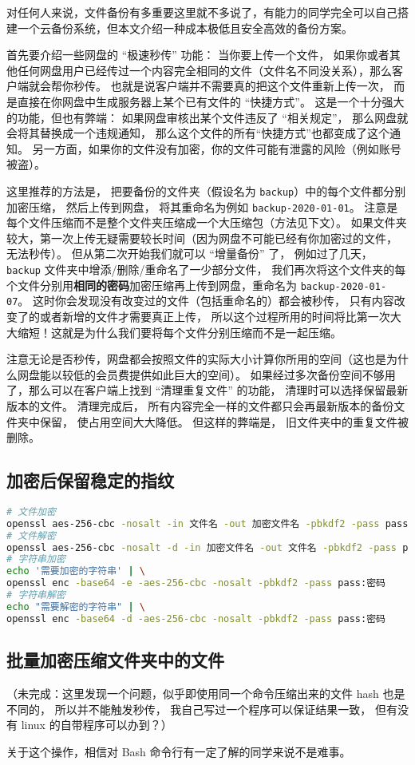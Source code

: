 
\begin{issues}
\issueDraft
\end{issues}

对任何人来说，文件备份有多重要这里就不多说了，有能力的同学完全可以自己搭建一个云备份系统，但本文介绍一种成本极低且安全高效的备份方案。

首先要介绍一些网盘的 “极速秒传” 功能： 当你要上传一个文件， 如果你或者其他任何网盘用户已经传过一个内容完全相同的文件（文件名不同没关系），那么客户端就会帮你秒传。 也就是说客户端并不需要真的把这个文件重新上传一次， 而是直接在你网盘中生成服务器上某个已有文件的 “快捷方式”。 这是一个十分强大的功能，但也有弊端： 如果网盘审核出某个文件违反了 “相关规定”， 那么网盘就会将其替换成一个违规通知， 那么这个文件的所有“快捷方式”也都变成了这个通知。 另一方面，如果你的文件没有加密，你的文件可能有泄露的风险（例如账号被盗）。

这里推荐的方法是， 把要备份的文件夹（假设名为 \verb|backup|）中的每个文件都分别加密压缩， 然后上传到网盘， 将其重命名为例如 \verb|backup-2020-01-01|。 注意是每个文件压缩而不是整个文件夹压缩成一个大压缩包（方法见下文）。 如果文件夹较大，第一次上传无疑需要较长时间（因为网盘不可能已经有你加密过的文件， 无法秒传）。 但从第二次开始我们就可以 “增量备份” 了， 例如过了几天， \verb|backup| 文件夹中增添/删除/重命名了一少部分文件， 我们再次将这个文件夹的每个文件分别用\textbf{相同的密码}加密压缩再上传到网盘，重命名为 \verb|backup-2020-01-07|。 这时你会发现没有改变过的文件（包括重命名的）都会被秒传， 只有内容改变了的或者新增的文件才需要真正上传， 所以这个过程所用的时间将比第一次大大缩短！这就是为什么我们要将每个文件分别压缩而不是一起压缩。

注意无论是否秒传，网盘都会按照文件的实际大小计算你所用的空间（这也是为什么网盘能以较低的会员费提供如此巨大的空间）。 如果经过多次备份空间不够用了，那么可以在客户端上找到 “清理重复文件” 的功能， 清理时可以选择保留最新版本的文件。 清理完成后， 所有内容完全一样的文件都只会再最新版本的备份文件夹中保留， 使占用空间大大降低。 但这样的弊端是， 旧文件夹中的重复文件被删除。

\subsection{加密后保留稳定的指纹}
\begin{lstlisting}[language=bash]
# 文件加密
openssl aes-256-cbc -nosalt -in 文件名 -out 加密文件名 -pbkdf2 -pass pass:密码
# 文件解密
openssl aes-256-cbc -nosalt -d -in 加密文件名 -out 文件名 -pbkdf2 -pass pass:密码
# 字符串加密
echo '需要加密的字符串' | \
openssl enc -base64 -e -aes-256-cbc -nosalt -pbkdf2 -pass pass:密码
# 字符串解密
echo "需要解密的字符串" | \
openssl enc -base64 -d -aes-256-cbc -nosalt -pbkdf2 -pass pass:密码
\end{lstlisting}

\subsection{批量加密压缩文件夹中的文件}

（未完成：这里发现一个问题，似乎即使用同一个命令压缩出来的文件 hash 也是不同的， 所以并不能触发秒传， 我自己写过一个程序可以保证结果一致， 但有没有 linux 的自带程序可以办到？）

关于这个操作，相信对 Bash 命令行\upref{Linux}有一定了解的同学来说不是难事。
